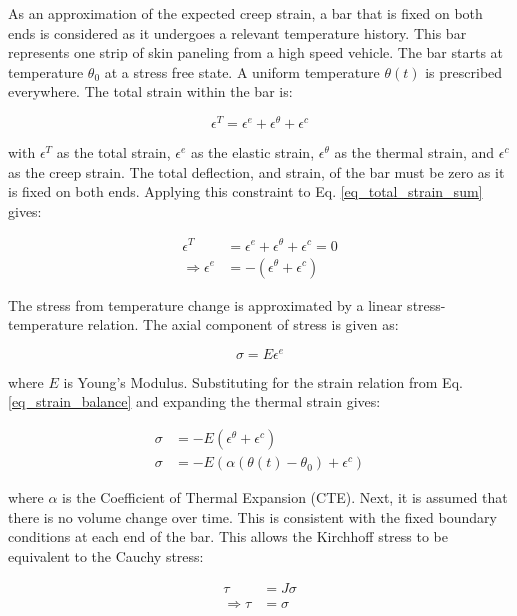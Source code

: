 \documentclass[conf]{new-aiaa}
\begin{document}
As an approximation of the expected creep strain,
a bar that is fixed on both ends is considered as it 
undergoes a relevant temperature history.
This bar represents one strip of skin paneling from 
a high speed vehicle.
The bar starts at temperature $\theta_0$ at a stress free state. 
A uniform temperature $\theta(t)$ is prescribed everywhere.
The total strain within the bar is:

\begin{equation}
\epsilon^T = \epsilon^e  + \epsilon^\theta+ \epsilon^c
\label{eq_total_strain_sum}
\end{equation}

\noindent
with $\epsilon^T$ as the total strain,
$\epsilon^e$ as the elastic strain,
$\epsilon^\theta$ as the thermal strain,
and
$\epsilon^c$ as the creep strain.
The total deflection, and strain, of the bar must be zero as it 
is fixed on both ends.
Applying this constraint to Eq. \ref{eq_total_strain_sum} gives:

\begin{align}
\epsilon^T &= \epsilon^e + \epsilon^\theta + \epsilon^c = 0 \\
\Rightarrow
  \epsilon^e &= -\left( \epsilon^\theta + \epsilon^c \right)  \label{eq_strain_balance}
\end{align}

\noindent
The stress from temperature change is approximated by
a linear stress-temperature relation. 
The axial component of stress is given as:

\begin{equation}
\sigma = E  \epsilon^e 
\end{equation}

\noindent
where $E$ is Young's Modulus.
Substituting for the strain relation from Eq. \ref{eq_strain_balance} 
and expanding the thermal strain gives:

\begin{align}
\sigma &= -E \left( \epsilon^\theta + \epsilon^c \right)  \\
\sigma &= -E \left( \alpha (\theta(t) - \theta_0) + \epsilon^c \right) 
\label{eq_cauchy_stress_sum}
\end{align}

\noindent
where $\alpha$ is the Coefficient of Thermal Expansion (CTE).
Next, it is assumed that there is no volume change over time.
This is consistent with the fixed boundary conditions at 
each end of the bar.
This allows the Kirchhoff stress to be equivalent to the Cauchy stress:

\begin{align}
\tau &= J \sigma \\
\Rightarrow
  \tau &= \sigma \label{eq_cauchy_to_kirchoff}
\end{align}
\end{document}
